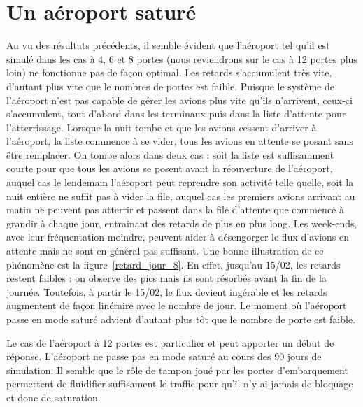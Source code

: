 
\section{Un aéroport saturé}
Au vu des résultats précédents, il semble évident que l'aéroport tel qu'il est simulé dans les cas à 4, 6 et 8 portes (nous reviendrons sur le cas à 12 portes plus loin) ne fonctionne pas de façon optimal.
Les retards s'accumulent très vite, d'autant plus vite que le nombres de portes est faible. Puisque le système de l'aéroport n'est pas capable de gérer les avions plus vite qu'ils n'arrivent, ceux-ci s'accumulent, tout d'abord dans les terminaux puis dans la liste d'attente pour l'atterrissage.
Lorsque la nuit tombe et que les avions cessent d'arriver à l'aéroport, la liste commence à se vider, tous les avions en attente se posant sans être remplacer. On tombe alors dans deux cas : soit la liste est suffisamment courte pour que tous les avions se posent avant la réouverture de l'aéroport, auquel cas le lendemain l'aéroport peut reprendre son activité telle quelle, soit la nuit entière ne suffit pas à vider la file, auquel cas les premiers avions arrivant au matin ne peuvent pas atterrir et passent dans la file d'attente que commence à grandir à chaque jour, entrainant des retards de plus en plus long. Les week-ends, avec leur fréquentation moindre, peuvent aider à désengorger le flux d'avions en attente mais ne sont en général pas suffisant.
Une bonne illustration de ce phénomène est la figure~\ref{retard_jour_8}. En effet, jusqu'au 15/02, les retards restent faibles : on observe des pics mais ils sont résorbés avant la fin de la journée. Toutefois, à partir le 15/02, le flux devient ingérable et les retards augmentent de façon linéraire avec le nombre de jour.
Le moment où l'aéroport passe en mode saturé advient d'autant plus tôt que le nombre de porte est faible.

Le cas de l'aéroport à 12 portes est particulier et peut apporter un début de réponse. L'aéroport ne passe pas en mode saturé au cours des 90 jours de simulation. Il semble que le rôle de tampon joué par les portes d'embarquement permettent de fluidifier suffisament le traffic pour qu'il n'y ai jamais de bloquage et donc de saturation.

